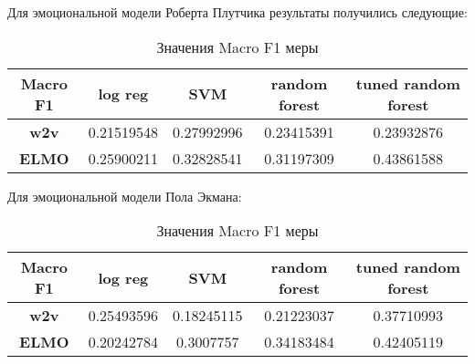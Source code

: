 \noindent
Для эмоциональной модели Роберта Плутчика результаты получились следующие:

\bigskip
\begin{table}[ht]
\caption{Значения Macro F1 меры}
\label{tab:plutchik}
\centering
\begin{tabular}{|c|c|c|c|c|}
\hline Macro F1 & \textbf{log reg} & \textbf{SVM} & \textbf{random forest} & \textbf{tuned random forest} \\
\hline \textbf{w2v} & 0.21519548 & 0.27992996 & 0.23415391 & 0.23932876 \\
\hline \textbf{ELMO} & 0.25900211 & 0.32828541 & 0.31197309 & 0.43861588 \\
\hline
\end{tabular}
\end{table}


\noindent
Для эмоциональной модели Пола Экмана:

\bigskip
\begin{table}[ht]
\caption{Значения Macro F1 меры}
\label{tab:ekman}
\centering
\begin{tabular}{|c|c|c|c|c|}
\hline Macro F1 & \textbf{log reg} & \textbf{SVM} & \textbf{random forest} & \textbf{tuned random forest} \\
\hline \textbf{w2v} & 0.25493596 & 0.18245115 & 0.21223037 & 0.37710993 \\
\hline \textbf{ELMO}& 0.20242784 & 0.3007757 & 0.34183484 & 0.42405119 \\
\hline
\end{tabular}
\end{table}
